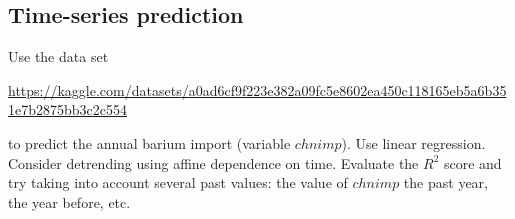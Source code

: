 \documentclass{article}
\begin{document}
 \subsection*{Time-series prediction}
     Use the data set 

      \url{https://kaggle.com/datasets/a0ad6cf9f223e382a09fc5e8602ea450c118165eb5a6b351e7b2875bb3c2c554} 

      to predict the annual barium import
    (variable $chnimp$). Use linear regression.
   Consider detrending using affine  dependence on time.  
   Evaluate the $R^2$ score and try taking into account several past values: the value of $chnimp$ the past year, the year before, etc. 
\end{document}
